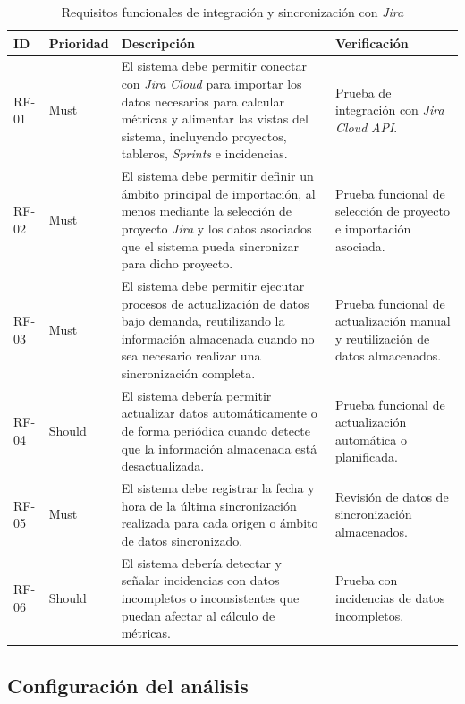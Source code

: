 {\renewcommand{\arraystretch}{1.28}\footnotesize
\begin{longtable}{p{1.35cm}p{1.65cm}p{6.9cm}p{2.9cm}}
\caption{Requisitos funcionales de integración y sincronización con \textit{Jira}}\label{tab:rf-integracion-jira}\\
\toprule
\textbf{ID} & \textbf{Prioridad} & \textbf{Descripción} & \textbf{Verificación} \\
\midrule
RF-01 & Must & El sistema debe permitir conectar con \textit{Jira Cloud} para importar los datos necesarios para calcular métricas y alimentar las vistas del sistema, incluyendo proyectos, tableros, \textit{Sprints} e incidencias. & Prueba de integración con \textit{Jira Cloud} \textit{API}. \\
RF-02 & Must & El sistema debe permitir definir un ámbito principal de importación, al menos mediante la selección de proyecto \textit{Jira} y los datos asociados que el sistema pueda sincronizar para dicho proyecto. & Prueba funcional de selección de proyecto e importación asociada. \\
RF-03 & Must & El sistema debe permitir ejecutar procesos de actualización de datos bajo demanda, reutilizando la información almacenada cuando no sea necesario realizar una sincronización completa. & Prueba funcional de actualización manual y reutilización de datos almacenados. \\
RF-04 & Should & El sistema debería permitir actualizar datos automáticamente o de forma periódica cuando detecte que la información almacenada está desactualizada. & Prueba funcional de actualización automática o planificada. \\
RF-05 & Must & El sistema debe registrar la fecha y hora de la última sincronización realizada para cada origen o ámbito de datos sincronizado. & Revisión de datos de sincronización almacenados. \\
RF-06 & Should & El sistema debería detectar y señalar incidencias con datos incompletos o inconsistentes que puedan afectar al cálculo de métricas. & Prueba con incidencias de datos incompletos. \\
\bottomrule
\end{longtable}
\vspace{0.45em}
}

\FloatBarrier
\subsection{Configuración del análisis}

